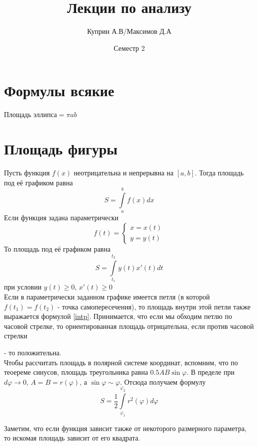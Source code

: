 \documentclass[a4paper]{article}
\title{Лекции по анализу}
\date{Семестр 2}
\author{Куприн А.В/Максимов Д.А}
\begin{document}
\maketitle
\tableofcontents
\newpage
\section{Формулы всякие}
Площадь эллипса$=\pi ab$

\section{Площадь фигуры}
Пусть функция $f(x)$ неотрицательна и непрерывна на $[a,b]$. 
Тогда площадь под её графиком равна 
\begin{equation} \label{int}
  S=\int\limits^b_af(x)dx  
\end{equation}
Если функция задана параметрически $$f(t)=\begin{cases}x=x(t)\\y=y(t)
\end{cases}$$
То площадь под её графиком равна
\begin{equation} \label{intp}
    S=\int\limits^{t_2}_{t_1}y(t)x'(t)dt
\end{equation}
при условии $y(t)\geqslant0$, $x'(t)\geqslant0$\\
Если в параметрически заданном графике имеется петля (в которой $f(t_1)=f(t_2)$ 
- точка самопересечения), то площадь внутри этой петли также выражается
формулой \ref{intp}. Принимается, что если мы обходим петлю по часовой 
стрелке, то ориентированная площадь отрицательна, если против часовой стрелки



- то положительна. \\
Чтобы рассчитать площадь в полярной системе координат, вспомним, что по 
теоереме синусов, площадь треугольника равна $0.5AB\sin\varphi$. В пределе при
$d\varphi\to0$, $A=B=r(\varphi)$, а $\sin\varphi\sim\varphi$. Отсюда получаем
формулу
$$S=\frac{1}{2}\int\limits^{\varphi_2}_{\varphi_1}r^2(\varphi)d\varphi$$

Заметим, что если функция зависит также от некоторого размерного параметра, 
то искомая площадь зависит от его квадрата.  
\end{document}
